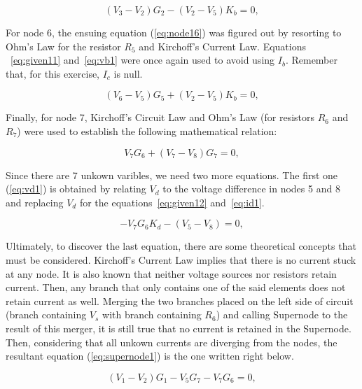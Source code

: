 \begin{equation}
  (V_{3} - V_{2})G_{2} - (V_{2} - V_{5})K_{b} = 0,
  \label{eq:node13}
\end{equation}

For node 6, the ensuing equation (\ref{eq:node16}) was figured out by resorting to Ohm's Law for the resistor $R_5$ and Kirchoff's Current Law. Equations ~\ref{eq:given11} and~\ref{eq:vb1} were once again used to avoid using $I_b$. Remember that, for this exercise, $I_c$ is null.

\begin{equation}
  (V_{6} - V_{5})G_{5} + (V_{2} - V_{5})K_{b} = 0,
  \label{eq:node16}
\end{equation}

Finally, for node 7, Kirchoff's Circuit Law and Ohm's Law (for resistors $R_6$ and $R_7$) were used to establish the following mathematical relation:

\begin{equation}
  V_{7}G_{6} + (V_{7} - V_{8})G_{7} = 0,
  \label{eq:node17}
\end{equation}

Since there are 7 unkown varibles, we need two more equations. The first one (\ref{eq:vd1}) is obtained by relating $V_d$ to the voltage difference in nodes 5 and 8 and replacing $V_d$ for the equations~\ref{eq:given12} and~\ref{eq:id1}.

\begin{equation}
  -V_{7}G_{6}K_{d} - (V_{5} - V_{8}) = 0,
  \label{eq:vd1}
\end{equation}

Ultimately, to discover the last equation, there are some theoretical concepts that must be considered. Kirchoff's Current Law implies that there is no current stuck at any node. It is also known that neither voltage sources nor resistors retain current. Then, any branch that only contains one of the said elements does not retain current as well. Merging the two branches placed on the left side of circuit (branch containing $V_s$ with branch containing $R_6$) and calling Supernode to the result of this merger, it is still true that no current is retained in the Supernode. Then, considering that all unkown currents are diverging from the nodes, the resultant equation (\ref{eq:supernode1}) is the one written right below.

\begin{equation}
  (V_{1} - V_{2})G_{1} - V_{5}G_{7} - V_{7}G_{6} = 0,
  \label{eq:supernode1}
\end{equation}

